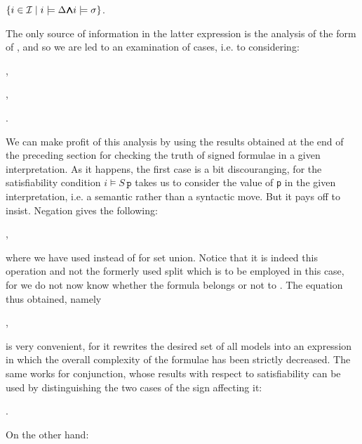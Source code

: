 \documentclass[a4paper,UKenglish]{lipics}
\newcounter{c}
\newcommand{\lett}[1]{\texttt{#1}}
\newcommand{\interprt}{\ensuremath{\mathcal{I}}}
\newcommand{\sat}[2]{\ensuremath{#1\models#2}}
\newcommand{\iset}[1]{\ensuremath{\{i\in\interprt \mid #1\}}}
\newcommand{\Mwedge}{\ensuremath{{\wedge\hspace{-0.65em}\wedge}\hspace{-0.65em}{\wedge\hspace{-0.65em}\wedge}}}
\begin{document}
\iset{\sat{i}{\Delta} \Mwedge \sat{i}{\sigma}}.



The only source of information in the latter expression is the analysis of the form of , and so we are led to an examination of cases, i.e. to considering:

,

,

.

\noindent We can make profit of this analysis by using the results obtained at the end of the preceding section for checking the truth of signed formulae in a given interpretation.
As it happens, the first case is a bit discouranging, for the satisfiability condition \sat{i}{S\,\lett{p}} takes us to consider the value of \lett{p} in the given interpretation, i.e. a semantic rather than a syntactic move. But it pays off to insist. Negation gives the following:












,



\noindent where we have used  instead of  for set union. 
Notice that it is indeed this operation and not the formerly used split  which is to be employed in this case, for we do not now know whether the formula 
belongs or not to .
The equation thus obtained, namely

,



\noindent is very convenient, for it rewrites the desired set of all models into an expression in which the overall complexity of the formulae has been strictly decreased. The same works for conjunction, whose results with respect to satisfiability can be used by distinguishing the two cases of the sign affecting it:











.



\noindent On the other hand:
\end{document}
